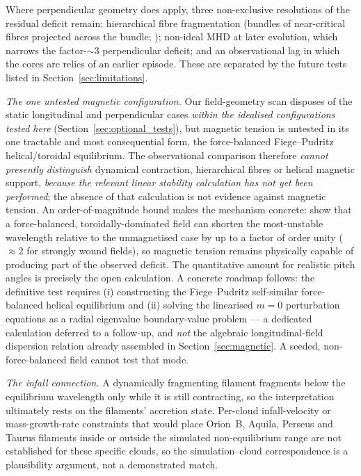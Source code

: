 \documentclass[usenatbib,twoside,twocolumn]{mnras}
\begin{document}
Where perpendicular geometry does apply, three non-exclusive resolutions of the residual deficit remain: hierarchical fibre fragmentation (bundles of near-critical fibres projected across the bundle; \citealt{Hacar2013,Hacar2018,Yang2024}); non-ideal MHD at later evolution, which narrows the factor-$\sim3$ perpendicular deficit; and an observational lag in which the cores are relics of an earlier episode. These are separated by the future tests listed in Section~\ref{sec:limitations}.

\emph{The one untested magnetic configuration.} Our field-geometry scan disposes of the static longitudinal and perpendicular cases \emph{within the idealised configurations tested here} (Section~\ref{sec:optional_tests}), but magnetic tension is untested in its one tractable and most consequential form, the force-balanced Fiege--Pudritz helical/toroidal equilibrium. The observational comparison therefore \emph{cannot presently distinguish} dynamical contraction, hierarchical fibres or helical magnetic support, \emph{because the relevant linear stability calculation has not yet been performed}; the absence of that calculation is not evidence against magnetic tension. An order-of-magnitude bound makes the mechanism concrete: \citet{Fiege2000} show that a force-balanced, toroidally-dominated field can shorten the most-unstable wavelength relative to the unmagnetised case by up to a factor of order unity ($\approx2$ for strongly wound fields), so magnetic tension remains physically capable of producing part of the observed deficit. The quantitative amount for realistic pitch angles is precisely the open calculation. A concrete roadmap follows: the definitive test requires (i) constructing the Fiege--Pudritz self-similar force-balanced helical equilibrium and (ii) solving the linearised $m=0$ perturbation equations as a radial eigenvalue boundary-value problem --- a dedicated calculation deferred to a follow-up, and \emph{not} the algebraic longitudinal-field dispersion relation already assembled in Section~\ref{sec:magnetic}. A seeded, non-force-balanced field cannot test that mode.

\emph{The infall connection.} A dynamically fragmenting filament fragments below the equilibrium wavelength only while it is still contracting, so the interpretation ultimately rests on the filaments' accretion state. Per-cloud infall-velocity or mass-growth-rate constraints that would place Orion~B, Aquila, Perseus and Taurus filaments inside or outside the simulated non-equilibrium range are not established for these specific clouds, so the simulation--cloud correspondence is a plausibility argument, not a demonstrated match.
\end{document}
